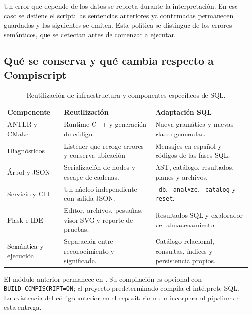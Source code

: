 \documentclass[11pt,a4paper]{article}
\begin{document}
Un error que depende de los datos se reporta durante la interpretación.
En ese caso se detiene el script: las sentencias anteriores ya confirmadas
permanecen guardadas y las siguientes se omiten. Esta política se distingue
de los errores semánticos, que se detectan antes de comenzar a ejecutar.

\subsection{Qué se conserva y qué cambia respecto a Compiscript}

\begin{table}[H]\centering\small
\begin{tabularx}{\textwidth}{@{}L{3.2cm}YY@{}}
\toprule
\textbf{Componente} & \textbf{Reutilización} & \textbf{Adaptación SQL}\\
\midrule
ANTLR y CMake & Runtime C++ y generación de código. & Nueva gramática y
nuevas clases generadas.\\
Diagnósticos & Listener que recoge errores y conserva ubicación. & Mensajes
en español y códigos de las fases SQL.\\
Árbol y JSON & Serialización de nodos y escape de cadenas. & AST, catálogo,
resultados, planes y archivos.\\
Servicio y CLI & Un núcleo independiente con salida JSON. & \texttt{--db},
\texttt{--analyze}, \texttt{--catalog} y \texttt{--reset}.\\
Flask e IDE & Editor, archivos, pestañas, visor SVG y reporte de pruebas.
& Resultados SQL y explorador del almacenamiento.\\
Semántica y ejecución & Separación entre reconocimiento y significado.
& Catálogo relacional, consultas, índices y persistencia propios.\\
\bottomrule
\end{tabularx}
\caption{Reutilización de infraestructura y componentes específicos de SQL.}
\end{table}

El módulo anterior permanece en . Su compilación
es opcional con \texttt{BUILD\_COMPISCRIPT=ON}; el proyecto predeterminado
compila el intérprete SQL. La existencia del código anterior en el
repositorio no lo incorpora al pipeline de esta entrega.
\end{document}

